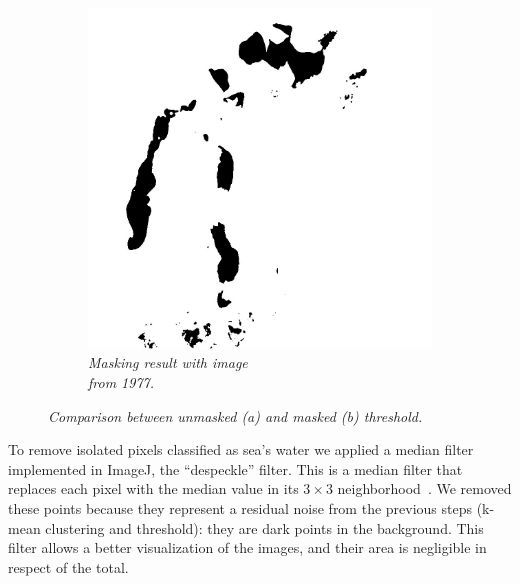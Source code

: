 \begin{figure}[H]
\begin{subfigure}[b]{.45\textwidth}
        \includegraphics[width=\textwidth]{../img/2015w.jpg}
        \caption{\emph{Masking result with image \\from 1977.}}
    \end{subfigure}
    \caption{\emph{Comparison between unmasked (a) and masked (b) threshold.}}
    \label{fig:masking}
\end{figure}
To remove isolated pixels classified as sea's water we applied a median filter implemented in ImageJ, the ``despeckle'' filter. 
This is a median filter that replaces each pixel with the median value in its $3 \times 3$ neighborhood~\cite{despeckle}.
We removed these points because they represent a residual noise from the previous steps (k-mean clustering and threshold): they are dark points in the background. 
This filter allows a better visualization of the images, and their area is negligible in respect of the total.

